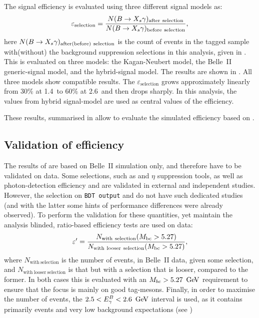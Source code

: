 The \BtoXsgamma signal efficiency is evaluated using three different signal models as:
\begin{equation}\label{eq:signal_efficiency}
    \varepsilon_{\mathrm{selection}} = \frac{N(\BtoXsgamma)_{\mathrm{after~selection}}}{N(\BtoXsgamma)_{\mathrm{before~selection}}},
\end{equation}
here $N(\BtoXsgamma)_{\mathrm{after(before)~selection}}$ is the count of \BtoXsgamma events in the \FEI tagged sample with(without) 
the background suppression selections in this analysis, given in .
This is evaluated on three models: the Kagan-Neubert model, the Belle~II generic-\MC signal model, and the hybrid-signal model.
The results are shown in .
All three models show compatible results.
The $\varepsilon_{\mathrm{selection}}$ grows approximately linearly from 30\% at 1.4~\gev to 60\% at 2.6~\gev and then drops sharply.
In this analysis, the values from hybrid signal-model are used as central values of the efficiency.

These results, summarised in  allow to evaluate the simulated efficiency based on .

\subsection{Validation of \texorpdfstring{\BtoXsgamma}{B->Xs gamma} efficiency}\label{sec:validation_efficiency}

The results of  are based on Belle~II simulation only, 
and therefore have to be validated on data.
Some selections, such as \piz and $\eta$ suppression tools, as well as photon-detection efficiency and \FEI are validated in external and independent studies.
However, the selection on \texttt{BDT~output} and \ZMVA do not have such dedicated studies (and with the latter some hints of performance differences were already observed).
To perform the validation for these quantities, yet maintain the analysis blinded, ratio-based efficiency tests are used on data:
\begin{equation}\label{eq:signal_validation}
    \varepsilon' = \frac{N_{\mathrm{with~selection}}({M_{\mathrm{bc}}}>5.27)}{N_{\mathrm{with~looser~selection}} ({M_{\mathrm{bc}}}>5.27)},
\end{equation}
where $N_{\mathrm{with~selection}}$ is the number of events, in Belle~II data, given some selection,
and $N_{\mathrm{with~looser~selection}}$ is that but with a selection that is looser, compared to the former.
In both cases this is evaluated with an $M_{bc}>5.27~\mathrm{\,Ge\kern -0.1em V}$ requirement to ensure that the focus is mainly on good tag-\B mesons.
Finally, in order to maximise the number of \BtoXsgamma events, the $2.5<{E^B_{\gamma}}<2.6~\mathrm{\,Ge\kern -0.1em V}$ interval is used, as it contains primarily \BtoXsgamma events and very low background expectations (see )


